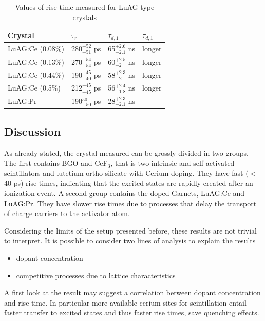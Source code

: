 \begin{table}[h]
\begin{center}
\begin{tabular}{|l|l|l|l|}
\hline
Crystal  & $\tau _{r}$ & $\tau _{d, 1}$ & $\tau _{d, 1}$ \\
\hline
LuAG:Ce (0.08$\%$)    & 280$_{-51}^{+52}$ ps         & 65$_{-2.1}^{+2.6}$ ns  & longer\\
\hline
LuAG:Ce (0.13$\%$)    & 270$_{-54}^{+54}$ ps         & 60$_{-2}^{+2.5}$ ns & longer\\ 
\hline
LuAG:Ce (0.44$\%$)     & 190$_{-40}^{+45}$ ps         & 58$_{-2}^{+2.3}$ ns  & longer \\ 
\hline
LuAG:Ce (0.5$\%$)      & 212$_{-45}^{+45}$ ps         & 56$_{-1.8}^{+2.4}$ ns  & longer \\ 
\hline
LuAG:Pr & 190$_{-50}^{50}$ ps         & 28$_{-2.1}^{+2.3}$ ns & \\
\hline 
\end{tabular}
\end{center}
\caption[Rise time values for LuAG crystals with VUV excitation]{Values of rise time measured for LuAG-type crystals}
\label{table:table_LUAG}
\end{table}

\subsection{Discussion}
As already stated, the crystal measured can be grossly divided in two groups.
The first contains BGO and CeF$_{3}$, that is two intrinsic and self activated scintillators and lutetium ortho silicate with Cerium doping. They have fast ($<$40 ps) rise times, indicating that the excited states are rapidly created after an ionization event.
A second group contains the doped Garnets, LuAG:Ce and LuAG:Pr. They have slower rise times due to processes that delay the transport of charge carriers to the activator atom.

Considering the limits of the setup presented before, these results are not trivial to interpret.
It is possible to consider two lines of analysis to explain the results 
\begin{itemize}
\item dopant concentration
\item competitive processes due to lattice characteristics
\end{itemize}
A first look at the result may suggest a correlation between dopant concentration and rise time. In particular more available cerium sites for scintillation entail faster transfer to excited states and thus faster rise times, save quenching effects.

